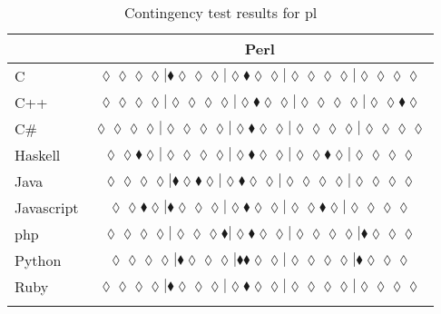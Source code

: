 \begin{table*}
\centering
\begin{tabular}{l c}
& Perl \\
\hline

C & $\scriptscriptstyle\lozenge\lozenge\lozenge\lozenge|\blacklozenge\lozenge\lozenge\lozenge|\lozenge\blacklozenge\lozenge\lozenge|\lozenge\lozenge\lozenge\lozenge|\lozenge\lozenge\lozenge\lozenge$ \\
C++ & $\scriptscriptstyle\lozenge\lozenge\lozenge\lozenge|\lozenge\lozenge\lozenge\lozenge|\lozenge\blacklozenge\lozenge\lozenge|\lozenge\lozenge\lozenge\lozenge|\lozenge\lozenge\blacklozenge\lozenge$ \\
C\# & $\scriptscriptstyle\lozenge\lozenge\lozenge\lozenge|\lozenge\lozenge\lozenge\lozenge|\lozenge\blacklozenge\lozenge\lozenge|\lozenge\lozenge\lozenge\lozenge|\lozenge\lozenge\lozenge\lozenge$ \\
Haskell & $\scriptscriptstyle\lozenge\lozenge\blacklozenge\lozenge|\lozenge\lozenge\lozenge\lozenge|\lozenge\blacklozenge\lozenge\lozenge|\lozenge\lozenge\blacklozenge\lozenge|\lozenge\lozenge\lozenge\lozenge$ \\
Java & $\scriptscriptstyle\lozenge\lozenge\lozenge\lozenge|\blacklozenge\lozenge\blacklozenge\lozenge|\lozenge\blacklozenge\lozenge\lozenge|\lozenge\lozenge\lozenge\lozenge|\lozenge\lozenge\lozenge\lozenge$ \\
Javascript & $\scriptscriptstyle\lozenge\lozenge\blacklozenge\lozenge|\blacklozenge\lozenge\lozenge\lozenge|\lozenge\blacklozenge\lozenge\lozenge|\lozenge\lozenge\blacklozenge\lozenge|\lozenge\lozenge\lozenge\lozenge$ \\
{\sc php} & $\scriptscriptstyle\lozenge\lozenge\lozenge\lozenge|\lozenge\lozenge\lozenge\blacklozenge|\lozenge\blacklozenge\lozenge\lozenge|\lozenge\lozenge\lozenge\lozenge|\blacklozenge\lozenge\lozenge\lozenge$ \\
Python & $\scriptscriptstyle\lozenge\lozenge\lozenge\lozenge|\blacklozenge\lozenge\lozenge\lozenge|\blacklozenge\blacklozenge\lozenge\lozenge|\lozenge\lozenge\lozenge\lozenge|\blacklozenge\lozenge\lozenge\lozenge$ \\
Ruby & $\scriptscriptstyle\lozenge\lozenge\lozenge\lozenge|\blacklozenge\lozenge\lozenge\lozenge|\lozenge\blacklozenge\lozenge\lozenge|\lozenge\lozenge\lozenge\lozenge|\lozenge\lozenge\lozenge\lozenge$ \\

\hline
& \\
\end{tabular}
\caption{Contingency test results for pl}
\label{tbl:contingency-test-results-pl}
\end{table*}


